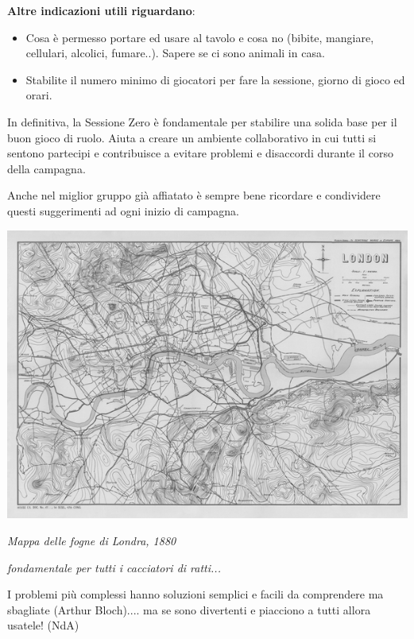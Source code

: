 \begin{multicols}{2}
\textbf{Altre indicazioni utili riguardano}:

\medskip

\begin{itemize}[leftmargin=*] \setlength{\itemsep}{0pt}
\item Cosa è permesso portare ed usare al tavolo e cosa no (bibite, mangiare, cellulari, alcolici, fumare..). Sapere se ci sono animali in casa.
\item Stabilite il numero minimo di giocatori per fare la sessione, giorno di gioco ed orari.
\end{itemize}

In definitiva, la Sessione Zero è fondamentale per stabilire una solida base per il buon gioco di ruolo. Aiuta a creare un ambiente collaborativo in cui tutti si sentono partecipi e contribuisce a evitare problemi e disaccordi durante il corso della campagna.

Anche nel miglior gruppo già affiatato è sempre bene ricordare e condividere questi suggerimenti ad ogni inizio di campagna.

\end{multicols}

\vfill

\begin{center}
\includegraphics[width=0.95\linewidth]{immagini/fognelondra.png}

\emph{Mappa delle fogne di Londra, 1880}

\emph{fondamentale per tutti i cacciatori di ratti...}
\end{center}

\bigskip

\begin{changemargin}{0.3cm}{0.3cm}\begin{enfasi}
{
I problemi più complessi hanno soluzioni semplici e facili da comprendere ma sbagliate (Arthur Bloch).... ma se sono divertenti e piacciono a tutti allora usatele! (NdA)
}
\end{enfasi}\end{changemargin}\medskip


%

\pagebreak

